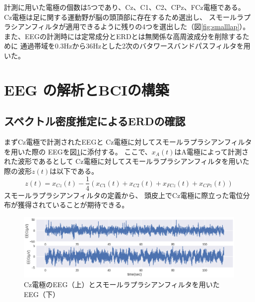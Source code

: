計測に用いた電極の個数は5つであり、Cz、C1、C2、CPz、FCz電極である。
Cz電極は足に関する運動野が脳の頭頂部に存在するため選出し、
スモールラプラシアンフィルタが適用できるように残りの4つを選出した（図\ref{fig:smalllap}）。
また、EEGの計測時には定常成分とERDとは無関係な高周波成分を削除するために
通過帯域を0.3Hzから36Hzとした2次のバタワースバンドパスフィルタを用いた。

\section{\rm EEG \mc の解析とBCIの構築}
\subsection{\mc スペクトル密度推定による\rm ERD\mc の確認}
まずCz電極で計測されたEEGと
Cz電極に対してスモールラプラシアンフィルタを用いた際の
EEGを図\ref{fig:eegsub1}に添付する。
ここで、\(x_{A}(t)\)はA電極によって計測された波形であるとして
Cz電極に対してスモールラプラシアンフィルタを用いた際の波形\(z(t)\)は以下である。
\begin{equation}
    z(t) = x_{Cz}(t) - \frac{1}{4}(x_{C1}(t) + x_{C2}(t) + x_{FCz}(t) + x_{CPz}(t))
\end{equation}
スモールラプラシアンフィルタの定義から、
頭皮上でCz電極に際立った電位分布が獲得されていることが期待できる。

\begin{figure}
    \centering
    \includegraphics[width=13cm]{images/eeg_sub1.png}
    \caption{Cz電極のEEG（上）とスモールラプラシアンフィルタを用いたEEG（下）}
    \label{fig:eegsub1}
\end{figure}


